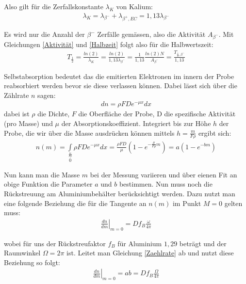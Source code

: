\documentclass[12pt]{article}
\begin{document}
Also gilt für die Zerfallskonstante $\lambda_K$ von Kalium:
\begin{align}
 \lambda_K=\lambda_{\beta^-} + \lambda_{\beta^+,EC}=1,13\lambda_{\beta^-}
\end{align}

Es wird nur die Anzahl der $\beta^-$ Zerfälle gemässen, also die Aktivität $A_{\beta^-}$. Mit Gleichungen \ref{Aktivität} und \ref{Halbzeit} folgt also für die Halbwertszeit:
\begin{align}
\label{zeit} T_{\frac{1}{2}} = \frac{ln(2)}{\lambda_K} = \frac{ln(2)}{1,13 \lambda_{\beta^-}} = \frac{1}{1,13} \frac{ln(2) N}{A_{\beta^-}} = \frac{T_{\frac{1}{2}, \beta^-}}{1,13}
\end{align}

Selbstabsorption bedeutet das die emitierten Elektronen im innern der Probe reabsorbiert werden bevor sie diese verlassen können. Dabei lässt sich über die Zählrate $n$ sagen:
\begin{align}
 dn=\rho F D e^{-\mu x} dx
\end{align}
dabei ist $\rho$ die Dichte, $F$ die Oberfläche der Probe, D die spezifische Aktivität (pro Masse) und $\mu$ der Absorptionskoeffizient. Integriert bis zur Höhe $h$ der Probe, die wir über die Masse ausdrücken können mittels $h = \frac{m}{F \rho}$ ergibt sich:
\begin{align}
  \label{Zaehlrate} n(m) = \int \limits_{0} \limits^{\frac{m}{F \rho}} \rho F D e^{-\mu x} dx = \frac{\rho F D}{\mu} \left( 1- e^{-\frac{\mu}{F \rho} m} \right) = a \left( 1 - e^{-bm} \right)
\end{align}

Nun kann man die Masse $m$ bei der Messung variieren und über eienen Fit an obige Funktion die Parameter $a$ und $b$ bestimmen. Nun muss noch die Rückstreuung am Aluminiumbehälter berücksichtigt werden. Dazu nutzt man eine folgende Beziehung die für die Tangente an $n(m)$ im Punkt $M=0$ gelten muss:
\begin{align}
 \left. \frac{dn}{dm}  \right|_{m=0} = D f_B \frac{\omega}{4\pi}
\end{align}

wobei für uns der Rückstreufaktor $f_B$ für Aluminium $1,29$ beträgt und der Raumwinkel $\Omega=2\pi$ ist. Leitet man Gleichung \ref{Zaehlrate} ab und nutzt diese Beziehung so folgt:
\begin{align}
  \left. \frac{dn}{dm}  \right|_{m=0} = ab =  D f_B \frac{\Omega}{4\pi}
\end{align}
\end{document}
